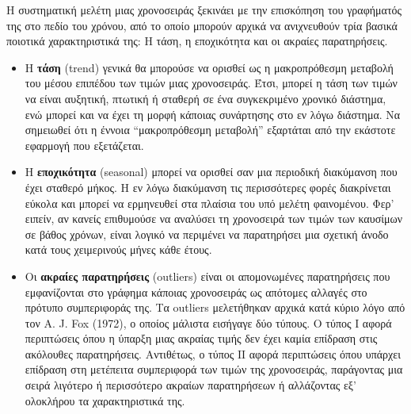 Η συστηματική μελέτη μιας χρονοσειράς ξεκινάει με την επισκόπηση του
γραφήματός της στο πεδίο του χρόνου, από το οποίο μπορούν αρχικά να ανιχνευθούν
τρία βασικά ποιοτικά χαρακτηριστικά της: Η τάση, η εποχικότητα και οι ακραίες
παρατηρήσεις.\\
\begin{itemize}

\item Η \textbf{τάση} (trend) γενικά θα μπορούσε να ορισθεί ως η μακροπρόθεσμη μεταβολή του
μέσου επιπέδου των τιμών μιας χρονοσειράς. Έτσι, μπορεί η τάση των τιμών να είναι
αυξητική, πτωτική ή σταθερή σε ένα συγκεκριμένο χρονικό διάστημα, ενώ μπορεί και να
έχει τη μορφή κάποιας συνάρτησης στο εν λόγω διάστημα. Να σημειωθεί ότι η έννοια
“μακροπρόθεσμη μεταβολή” εξαρτάται από την εκάστοτε εφαρμογή που εξετάζεται.
\item Η \textbf{εποχικότητα} (seasonal) μπορεί να ορισθεί σαν μια περιοδική διακύμανση που έχει
σταθερό μήκος. Η εν λόγω διακύμανση τις περισσότερες φορές διακρίνεται εύκολα και
μπορεί να ερμηνευθεί στα πλαίσια του υπό μελέτη φαινομένου. Φερ' ειπείν, αν
κανείς επιθυμούσε να αναλύσει τη χρονοσειρά των τιμών των καυσίμων σε βάθος
χρόνων, είναι λογικό να περιμένει να παρατηρήσει μια σχετική άνοδο κατά τους
χειμερινούς μήνες κάθε έτους.

\item Οι \textbf{ακραίες παρατηρήσεις} (outliers) είναι οι απομονωμένες παρατηρήσεις που
εμφανίζονται στο γράφημα κάποιας χρονοσειράς ως απότομες αλλαγές στο πρότυπο
συμπεριφοράς της. Τα outliers μελετήθηκαν αρχικά κατά κύριο λόγο από τον A. J. Fox
(1972), ο οποίος μάλιστα εισήγαγε δύο τύπους. Ο τύπος I αφορά περιπτώσεις όπου η
ύπαρξη μιας ακραίας τιμής δεν έχει καμία επίδραση στις ακόλουθες παρατηρήσεις.
Αντιθέτως, ο τύπος ΙΙ αφορά περιπτώσεις όπου υπάρχει επίδραση στη μετέπειτα
συμπεριφορά των τιμών της χρονοσειράς, παράγοντας μια σειρά λιγότερο ή περισσότερο
ακραίων παρατηρήσεων ή αλλάζοντας εξ’ ολοκλήρου τα χαρακτηριστικά της.
\end{itemize}

